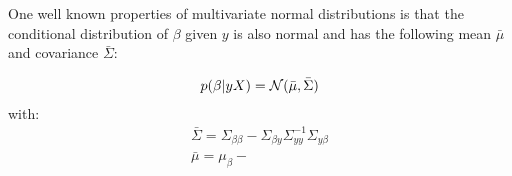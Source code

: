 One well known properties of multivariate normal distributions is that the conditional distribution of
$\beta$ given $y$ is also normal and has the following mean $\bar{\mu}$ and covariance $\bar{\Sigma}$:

\begin{gather}
    p(\beta | y X) = \operatorname{\mathcal{N}}(\bar{\mu}, \bar{\Sigma}) \\
\end{gather}
with:
\begin{gather}
    \bar{\Sigma} = \Sigma_{\beta \beta} - \Sigma_{\beta y} \Sigma_{y y}^{-1} \Sigma_{y \beta} \\
    \bar{\mu} = \mu_{\beta} -
\end{gather}

%
%
%
%


%
%
%

